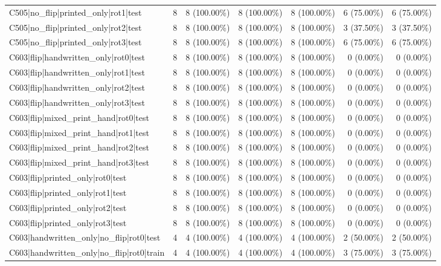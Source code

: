 \begin{longtable}{>{\raggedright\arraybackslash}p{5cm}rrrrrr}
C505|no\_flip|printed\_only|rot1|test & 8 & 8 (100.00\%) & 8 (100.00\%) & 8 (100.00\%) & 6 (75.00\%) & 6 (75.00\%) \\
C505|no\_flip|printed\_only|rot2|test & 8 & 8 (100.00\%) & 8 (100.00\%) & 8 (100.00\%) & 3 (37.50\%) & 3 (37.50\%) \\
C505|no\_flip|printed\_only|rot3|test & 8 & 8 (100.00\%) & 8 (100.00\%) & 8 (100.00\%) & 6 (75.00\%) & 6 (75.00\%) \\
C603|flip|handwritten\_only|rot0|test & 8 & 8 (100.00\%) & 8 (100.00\%) & 8 (100.00\%) & 0 (0.00\%) & 0 (0.00\%) \\
C603|flip|handwritten\_only|rot1|test & 8 & 8 (100.00\%) & 8 (100.00\%) & 8 (100.00\%) & 0 (0.00\%) & 0 (0.00\%) \\
C603|flip|handwritten\_only|rot2|test & 8 & 8 (100.00\%) & 8 (100.00\%) & 8 (100.00\%) & 0 (0.00\%) & 0 (0.00\%) \\
C603|flip|handwritten\_only|rot3|test & 8 & 8 (100.00\%) & 8 (100.00\%) & 8 (100.00\%) & 0 (0.00\%) & 0 (0.00\%) \\
C603|flip|mixed\_print\_hand|rot0|test & 8 & 8 (100.00\%) & 8 (100.00\%) & 8 (100.00\%) & 0 (0.00\%) & 0 (0.00\%) \\
C603|flip|mixed\_print\_hand|rot1|test & 8 & 8 (100.00\%) & 8 (100.00\%) & 8 (100.00\%) & 0 (0.00\%) & 0 (0.00\%) \\
C603|flip|mixed\_print\_hand|rot2|test & 8 & 8 (100.00\%) & 8 (100.00\%) & 8 (100.00\%) & 0 (0.00\%) & 0 (0.00\%) \\
C603|flip|mixed\_print\_hand|rot3|test & 8 & 8 (100.00\%) & 8 (100.00\%) & 8 (100.00\%) & 0 (0.00\%) & 0 (0.00\%) \\
C603|flip|printed\_only|rot0|test & 8 & 8 (100.00\%) & 8 (100.00\%) & 8 (100.00\%) & 0 (0.00\%) & 0 (0.00\%) \\
C603|flip|printed\_only|rot1|test & 8 & 8 (100.00\%) & 8 (100.00\%) & 8 (100.00\%) & 0 (0.00\%) & 0 (0.00\%) \\
C603|flip|printed\_only|rot2|test & 8 & 8 (100.00\%) & 8 (100.00\%) & 8 (100.00\%) & 0 (0.00\%) & 0 (0.00\%) \\
C603|flip|printed\_only|rot3|test & 8 & 8 (100.00\%) & 8 (100.00\%) & 8 (100.00\%) & 0 (0.00\%) & 0 (0.00\%) \\
C603|handwritten\_only|no\_flip|rot0|test & 4 & 4 (100.00\%) & 4 (100.00\%) & 4 (100.00\%) & 2 (50.00\%) & 2 (50.00\%) \\
C603|handwritten\_only|no\_flip|rot0|train & 4 & 4 (100.00\%) & 4 (100.00\%) & 4 (100.00\%) & 3 (75.00\%) & 3 (75.00\%) \\

\end{longtable}
